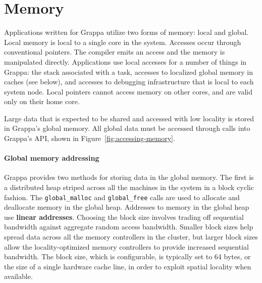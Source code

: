 \section{Memory}

Applications written for Grappa utilize two forms of memory: local and global.
Local memory is local to a single core  in
the system. Accesses occur through conventional pointers. The compiler emits
an access and the memory is manipulated directly. Applications use local
accesses for a number of things in Grappa: the stack associated with a task,
accesses to localized global memory in caches (see below), and accesses to
debugging infrastructure that is local to each system node. Local pointers
cannot access memory on other cores, and are valid only on their home core.

Large data that is expected to be shared and accessed with low locality is
stored in Grappa's global memory. All global data must be accessed through
calls into Grappa's API, shown in Figure~\ref{fig:accessing-memory}.

\paragraph{Global memory addressing} Grappa provides two methods for storing
data in the global memory. The first is a distributed heap striped across all
the machines in the system in a block cyclic fashion. The
\texttt{global\_malloc} and \texttt{global\_free} calls are used to allocate
and deallocate memory in the global heap. Addresses to memory in the global
heap use \textbf{linear addresses}. Choosing the block size involves trading
off sequential bandwidth against aggregate random access bandwidth. Smaller
block sizes help spread data across all the memory controllers in the cluster,
but larger block sizes allow the locality-optimized memory controllers to
provide increased sequential bandwidth. The block size, which is configurable,
is typically set to 64 bytes, or the size of a single hardware cache line, in
order to exploit spatial locality when available. 


